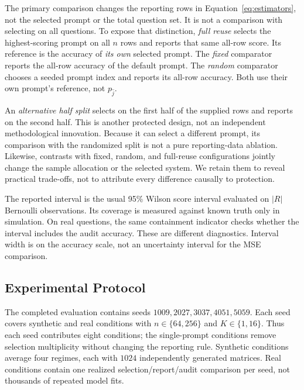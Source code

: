\documentclass{article}
\begin{document}
The primary comparison changes the reporting rows in Equation~\ref{eq:estimators}, not the selected prompt or the total question set. It is not a comparison with selecting on all questions. To expose that distinction, \emph{full reuse} selects the highest-scoring prompt on all $n$ rows and reports that same all-row score. Its reference is the accuracy of \emph{its own} selected prompt. The \emph{fixed} comparator reports the all-row accuracy of the default prompt. The \emph{random} comparator chooses a seeded prompt index and reports its all-row accuracy. Both use their own prompt's reference, not $p_{\widehat j}$.

An \emph{alternative half split} selects on the first half of the supplied rows and reports on the second half. This is another protected design, not an independent methodological innovation. Because it can select a different prompt, its comparison with the randomized split is not a pure reporting-data ablation. Likewise, contrasts with fixed, random, and full-reuse configurations jointly change the sample allocation or the selected system. We retain them to reveal practical trade-offs, not to attribute every difference causally to protection.

The reported interval is the usual 95\% Wilson score interval evaluated on $|R|$ Bernoulli observations. Its coverage is measured against known truth only in simulation. On real questions, the same containment indicator checks whether the interval includes the audit accuracy. These are different diagnostics. Interval width is on the accuracy scale, not an uncertainty interval for the MSE comparison.

\subsection{Experimental Protocol}
The completed evaluation contains seeds $1009,2027,3037,4051,5059$. Each seed covers synthetic and real conditions with $n\in\{64,256\}$ and $K\in\{1,16\}$. Thus each seed contributes eight conditions; the single-prompt conditions remove selection multiplicity without changing the reporting rule. Synthetic conditions average four regimes, each with $1024$ independently generated matrices. Real conditions contain one realized selection/report/audit comparison per seed, not thousands of repeated model fits.
\end{document}
